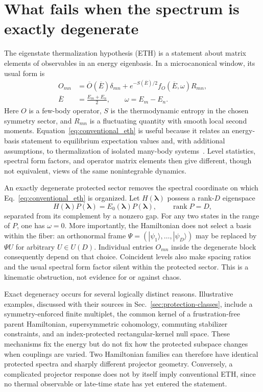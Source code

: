\section{What fails when the spectrum is exactly degenerate}
\label{sec:eth_failure}

The eigenstate thermalization hypothesis (ETH) is a statement about matrix
elements of observables in an energy eigenbasis.  In a microcanonical window,
its usual form is
\begin{align}
 O_{mn}&=\overline O(\overline E)\delta_{mn}
 +e^{-S(\overline E)/2}f_O(\overline E,\omega)R_{mn},
 \label{eq:conventional_eth}
 \\
 \overline E&=\frac{E_m+E_n}{2},\qquad
 \omega=E_m-E_n .\nonumber
\end{align}
Here $O$ is a few-body operator, $S$ is the thermodynamic entropy in the
chosen symmetry sector, and $R_{mn}$ is a fluctuating quantity with smooth
local second moments.  Equation~\eqref{eq:conventional_eth} is useful because
it relates an energy-basis statement to equilibrium expectation values and,
with additional assumptions, to thermalization of isolated many-body
systems~\cite{deutsch1991,srednicki1994,rigol2008,dalessio2016}.  Level
statistics, spectral form factors, and operator matrix elements then give
different, though not equivalent, views of the same nonintegrable dynamics.

An exactly degenerate protected sector removes the spectral coordinate on
which Eq.~\eqref{eq:conventional_eth} is organized.  Let
$H(\boldsymbol\lambda)$ possess a rank-$D$ eigenspace
\begin{equation}
 H(\boldsymbol\lambda)P(\boldsymbol\lambda)
 =E_0(\boldsymbol\lambda)P(\boldsymbol\lambda),
 \qquad \operatorname{rank}P=D,
 \label{eq:protected_projector}
\end{equation}
separated from its complement by a nonzero gap.  For any two states in the
range of $P$, one has $\omega=0$.  More importantly, the Hamiltonian does not
select a basis within the fiber: an orthonormal frame
$\Psi=(|\psi_1\rangle,\ldots,|\psi_D\rangle)$ may be replaced by
$\Psi U$ for arbitrary $U\in U(D)$.  Individual entries $O_{mn}$ inside the
degenerate block consequently depend on that choice.  Coincident levels also
make spacing ratios and the usual spectral form factor silent within the
protected sector.  This is a kinematic obstruction, not evidence for or
against chaos.

Exact degeneracy occurs for several logically distinct reasons.  Illustrative
examples, discussed with their sources in Sec.~\ref{sec:protection-classes},
include a symmetry-enforced finite multiplet, the common kernel of a
frustration-free parent Hamiltonian, supersymmetric cohomology, commuting
stabilizer constraints, and an index-protected rectangular-kernel null space.
These mechanisms fix
the energy but do not fix how the protected subspace changes when couplings
are varied.  Two Hamiltonian families can therefore have identical protected
spectra and sharply different projector geometry.  Conversely, a complicated
projector response does not by itself imply conventional ETH, since no
thermal observable or late-time state has yet entered the statement.

